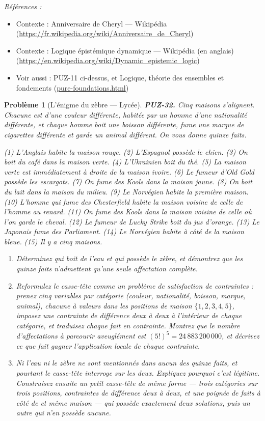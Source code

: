 \documentclass[11pt]{article}
\newtheorem{problem}{Problème}
\newenvironment{refs}{\par\small\noindent\emph{Références :}\begin{itemize}\setlength\itemsep{0pt}}{\end{itemize}\normalsize}
\begin{document}
\begin{refs}
\item Contexte : Anniversaire de Cheryl --- Wikipédia (\url{https://fr.wikipedia.org/wiki/Anniversaire_de_Cheryl})
\item Contexte : Logique épistémique dynamique --- Wikipédia (en anglais) (\url{https://en.wikipedia.org/wiki/Dynamic_epistemic_logic})
\item Voir aussi : PUZ-11 ci-dessus, et Logique, théorie des ensembles et fondements (\url{pure-foundations.html})
\end{refs}

\bigskip

\begin{problem}[{L'énigme du zèbre --- Lycée}]
\textbf{PUZ-32.} Cinq maisons s'alignent. Chacune est d'une couleur différente,
habitée par un homme d'une nationalité différente, et chaque homme boit une boisson
différente, fume une marque de cigarettes différente et garde un animal différent. On vous
donne quinze faits.

\noindent (1) L'Anglais habite la maison rouge. (2) L'Espagnol possède le chien. (3) On boit du
café dans la maison verte. (4) L'Ukrainien boit du thé. (5) La maison verte est
immédiatement à droite de la maison ivoire. (6) Le fumeur d'Old Gold possède les
escargots. (7) On fume des Kools dans la maison jaune. (8) On boit du lait dans la maison
du milieu. (9) Le Norvégien habite la première maison. (10) L'homme qui fume des
Chesterfield habite la maison voisine de celle de l'homme au renard. (11) On fume des
Kools dans la maison voisine de celle où l'on garde le cheval. (12) Le fumeur de Lucky
Strike boit du jus d'orange. (13) Le Japonais fume des Parliament. (14) Le Norvégien
habite à côté de la maison bleue. (15) Il y a cinq maisons.
\begin{enumerate}
\item[(a)] Déterminez qui boit de l'eau et qui possède le zèbre, et démontrez que les quinze
faits n'admettent qu'une seule affectation complète.
\item[(b)] Reformulez le casse-tête comme un problème de satisfaction de contraintes : prenez
cinq variables par catégorie (couleur, nationalité, boisson, marque, animal), chacune à
valeurs dans les positions de maison $ \{1,2,3,4,5\} $, imposez une contrainte de
différence deux à deux à l'intérieur de chaque catégorie, et traduisez chaque fait en
contrainte. Montrez que le nombre d'affectations à parcourir aveuglément est
$ (5!)^{5} = 24\,883\,200\,000 $, et décrivez ce que fait gagner l'application locale de
chaque contrainte.
\item[(c)] Ni l'eau ni le zèbre ne sont mentionnés dans aucun des quinze faits, et pourtant le
casse-tête interroge sur les deux. Expliquez pourquoi c'est légitime. Construisez ensuite
un petit casse-tête de même forme --- trois catégories sur trois positions, contraintes de
différence deux à deux, et une poignée de faits \og{} à côté de \fg{} et \og{} même maison \fg{} --- qui
possède exactement deux solutions, puis un autre qui n'en possède aucune.
\end{enumerate}

\end{problem}
\end{document}
